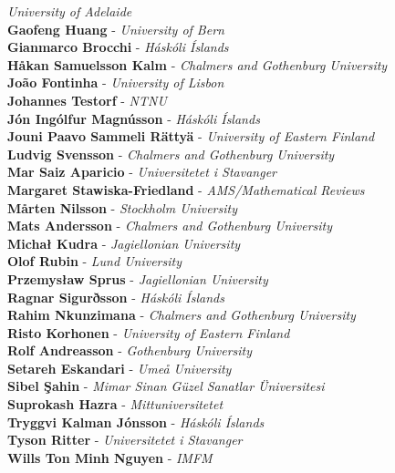 \documentclass[12pt, openany, twoside]{report}      %
\begin{document}
\textit{University of Adelaide}
\\
\textbf{Gaofeng Huang} -
\textit{University of Bern}
\\
\textbf{Gianmarco Brocchi} -
\textit{Háskóli Íslands}
\\
\textbf{Håkan Samuelsson Kalm} -
\textit{Chalmers and Gothenburg University}
\\
\textbf{João Fontinha} -
\textit{University of Lisbon}
\\
\textbf{Johannes Testorf} -
\textit{NTNU}
\\
\textbf{Jón Ingólfur Magnússon} -
\textit{Háskóli Íslands}
\\
\textbf{Jouni Paavo Sammeli Rättyä} -
\textit{University of Eastern Finland}
\\
\textbf{Ludvig Svensson} -
\textit{Chalmers and Gothenburg University}
\\
\textbf{Mar Saiz Aparicio} -
\textit{Universitetet i Stavanger}
\\
\textbf{Margaret Stawiska-Friedland} -
\textit{AMS/Mathematical Reviews}
\\
\textbf{Mårten Nilsson} -
\textit{Stockholm University}
\\
\textbf{Mats Andersson} -
\textit{Chalmers and Gothenburg University}
\\
\textbf{Michał Kudra} -
\textit{Jagiellonian University}
\\
\textbf{Olof Rubin} -
\textit{Lund University}
\\
\textbf{Przemysław Sprus} -
\textit{Jagiellonian University}
\\
\textbf{Ragnar Sigurðsson} -
\textit{Háskóli Íslands}
\\
\textbf{Rahim Nkunzimana} -
\textit{Chalmers and Gothenburg University}
\\
\textbf{Risto Korhonen} -
\textit{University of Eastern Finland}
\\
\textbf{Rolf Andreasson} -
\textit{Gothenburg University}
\\
\textbf{Setareh Eskandari} -
\textit{Umeå University}
\\
\textbf{Sibel Şahin} -
\textit{Mimar Sinan Güzel Sanatlar Üniversitesi}
\\
\textbf{Suprokash Hazra} -
\textit{Mittuniversitetet}
\\
\textbf{Tryggvi Kalman Jónsson} -
\textit{Háskóli Íslands}
\\
\textbf{Tyson Ritter} -
\textit{Universitetet i Stavanger}
\\
\textbf{Wills Ton Minh Nguyen} -
\textit{IMFM}
\restoregeometry
\end{document}
